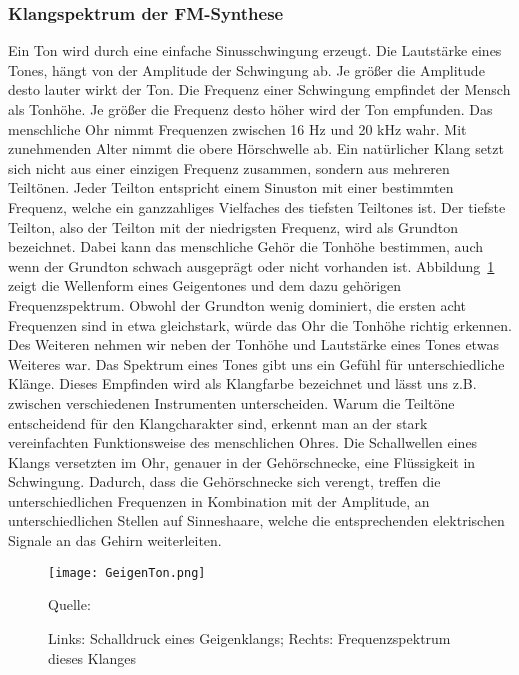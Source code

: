 \subsubsection{Klangspektrum der FM-Synthese}
\label{bulli:ohrToeneUndFrequenzen}
Ein Ton wird durch eine einfache Sinusschwingung erzeugt. Die Lautstärke eines Tones, hängt von der Amplitude der Schwingung ab. Je größer die Amplitude desto lauter wirkt der Ton. Die Frequenz einer Schwingung empfindet der Mensch als Tonhöhe. Je größer die Frequenz desto höher wird der Ton empfunden. 
Das menschliche Ohr nimmt Frequenzen zwischen 16 Hz und 20 kHz wahr. Mit zunehmenden Alter nimmt die obere Hörschwelle ab. \cite[S. 199]{borucki}
Ein natürlicher Klang setzt sich nicht aus einer einzigen Frequenz zusammen, sondern aus mehreren Teiltönen. Jeder Teilton entspricht einem Sinuston mit einer bestimmten Frequenz, welche ein ganzzahliges Vielfaches des tiefsten Teiltones ist. Der tiefste Teilton, also der Teilton mit der niedrigsten Frequenz, wird als Grundton bezeichnet. \cite[S. 87]{borucki} 
Dabei kann das menschliche Gehör die Tonhöhe bestimmen, auch wenn der Grundton schwach ausgeprägt oder nicht vorhanden ist. \cite[S. 4]{zwicker} Abbildung~\ref{fig:geige} zeigt die Wellenform eines Geigentones und dem dazu gehörigen Frequenzspektrum. Obwohl der Grundton wenig dominiert, die ersten acht Frequenzen sind in etwa gleichstark, würde das Ohr die Tonhöhe richtig erkennen. Des Weiteren nehmen wir neben der Tonhöhe und Lautstärke eines Tones etwas Weiteres war. Das Spektrum eines Tones gibt uns ein Gefühl für unterschiedliche Klänge. Dieses Empfinden wird als Klangfarbe bezeichnet und lässt uns z.B. zwischen verschiedenen Instrumenten unterscheiden. \cite[S. 5]{zwicker} \cite[S. 226]{raichel}
Warum die Teiltöne entscheidend für den Klangcharakter sind, erkennt man an der stark vereinfachten Funktionsweise des menschlichen Ohres. Die Schallwellen eines Klangs versetzten im Ohr, genauer in der Gehörschnecke, eine Flüssigkeit in Schwingung. Dadurch, dass die Gehörschnecke sich verengt, treffen die unterschiedlichen Frequenzen in Kombination mit der Amplitude, an unterschiedlichen Stellen auf Sinneshaare, welche die entsprechenden elektrischen Signale an das Gehirn weiterleiten. \cite[S. 87 f.]{zwicker}

\begin{figure} [ht]
\centering
  \texttt{[image: GeigenTon.png]}
\caption{Links: Schalldruck eines Geigenklangs; Rechts: Frequenzspektrum dieses Klanges}
\label{fig:geige}
Quelle: \cite[S. 4]{zwicker}
\end{figure}
\FloatBarrier

